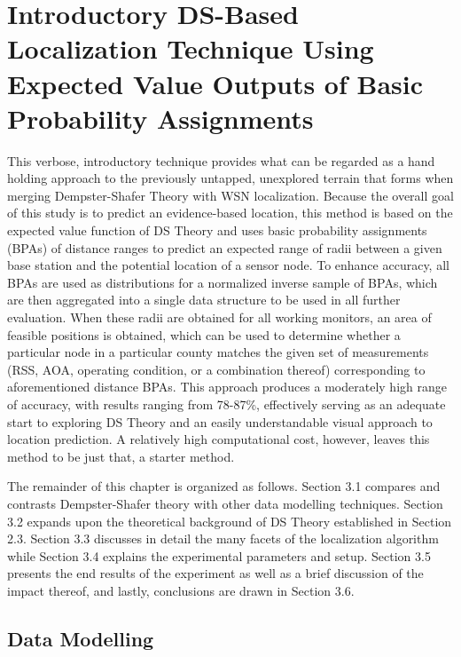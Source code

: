 \documentclass[12pt]{uthesis-v12}  %
\begin{document}
\chapter{Introductory DS-Based Localization Technique Using Expected Value Outputs of Basic Probability Assignments}

This verbose, introductory technique provides what can be regarded as a hand holding approach to the previously untapped, unexplored terrain that forms when merging Dempster-Shafer Theory with WSN localization. Because the overall goal of this study is to predict an evidence-based location, this method is based on the expected value function of DS Theory and uses basic probability assignments (BPAs) of distance ranges to predict an expected range of radii between a given base station and the potential location of a sensor node. To enhance accuracy, all BPAs are used as distributions for a normalized inverse sample of BPAs, which are then aggregated into a single data structure to be used in all further evaluation. When these radii are obtained for all working monitors, an area of feasible positions is obtained, which can be used to determine whether a particular node in a particular county matches the given set of measurements (RSS, AOA, operating condition, or a combination thereof) corresponding to aforementioned distance BPAs. This approach produces a moderately high range of accuracy, with results ranging from 78-87\%, effectively serving as an adequate start to exploring DS Theory and an easily understandable visual approach to location prediction. A relatively high computational cost, however, leaves this method to be just that, a starter method.

The remainder of this chapter is organized as follows. Section 3.1 compares and contrasts Dempster-Shafer theory with other data modelling techniques. Section 3.2 expands upon the theoretical background of DS Theory established in Section 2.3. Section 3.3 discusses in detail the many facets of the localization algorithm while Section 3.4 explains the experimental parameters and setup. Section 3.5 presents the end results of the experiment as well as a brief discussion of the impact thereof, and lastly, conclusions are drawn in Section 3.6.

\section{Data Modelling} 
\end{document}
